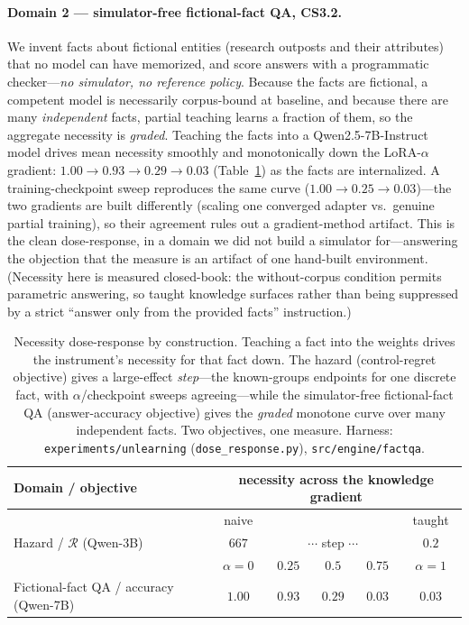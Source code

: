 \documentclass{article}
\newcommand{\regret}{\mathcal{R}}
\begin{document}
\paragraph{Domain 2 --- simulator-free fictional-fact QA, CS3.2.} We invent facts about fictional entities
(research outposts and their attributes) that no model can have memorized, and score answers with a
programmatic checker---\emph{no simulator, no reference policy}. Because the facts are fictional, a
competent model is necessarily corpus-bound at baseline, and because there are many \emph{independent}
facts, partial teaching learns a fraction of them, so the aggregate necessity is \emph{graded}.
Teaching the facts into a Qwen2.5-7B-Instruct model drives mean necessity smoothly and monotonically
down the LoRA-$\alpha$ gradient: $1.00\!\to\!0.93\!\to\!0.29\!\to\!0.03$ (Table~\ref{tab:dose}) as the
facts are internalized. A
training-checkpoint sweep reproduces the same curve ($1.00\!\to\!0.25\!\to\!0.03$)---the two gradients
are built differently (scaling one converged adapter vs.\ genuine partial training), so their
agreement rules out a gradient-method artifact. This is the clean dose-response, in a domain we did
not build a simulator for---answering the objection that the measure is an artifact of one hand-built
environment. (Necessity here is measured closed-book:
the without-corpus condition permits parametric answering, so taught knowledge surfaces rather than
being suppressed by a strict ``answer only from the provided facts'' instruction.)

\begin{table}[t]
\centering\small
\begin{tabular}{@{}lccccc@{}}
\toprule
Domain / objective & \multicolumn{5}{c}{necessity across the knowledge gradient} \\
\midrule
& naive & & & & taught \\
Hazard / $\regret$ (Qwen-3B) & $667$ & \multicolumn{3}{c}{$\cdots$ step $\cdots$} & $0.2$ \\
\midrule
& $\alpha{=}0$ & $0.25$ & $0.5$ & $0.75$ & $\alpha{=}1$ \\
Fictional-fact QA / accuracy (Qwen-7B) & $1.00$ & $0.93$ & $0.29$ & $0.03$ & $0.03$ \\
\bottomrule
\end{tabular}
\caption{Necessity dose-response by construction. Teaching a fact into the weights drives the
instrument's necessity for that fact down. The hazard (control-regret objective) gives a
large-effect \emph{step}---the known-groups endpoints for one discrete fact, with $\alpha$/checkpoint
sweeps agreeing---while the simulator-free fictional-fact QA (answer-accuracy objective) gives the
\emph{graded} monotone curve over many independent facts. Two objectives, one measure. Harness:
\texttt{experiments/unlearning} (\texttt{dose\_response.py}), \texttt{src/engine/factqa}.}
\label{tab:dose}
\end{table}
\end{document}
